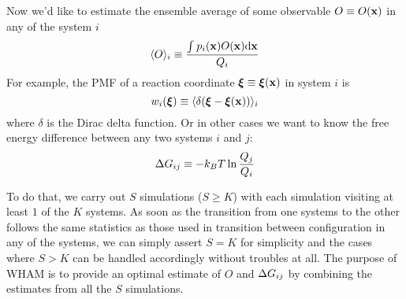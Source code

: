 Now we'd like to estimate the ensemble average of some observable 
$O \equiv O(\mathbf{x})$ in any of the system $i$
\begin{equation}\label{eq:O}
\langle O \rangle_{i} \equiv \frac{\int_{}^{}{p_{i}(\mathbf{x})O}(\mathbf{x})\mathrm{d}\mathbf{x}}{Q_{i}}
\end{equation}
For example, the PMF of a reaction coordinate 
$\boldsymbol\xi \equiv \boldsymbol\xi(\mathbf{x})$ in system $i$ is
\begin{equation}
\label{eq:PMF}
w_{i}(\boldsymbol\xi) \equiv \langle \delta(\boldsymbol\xi - \boldsymbol\xi(\mathbf{x})) \rangle_{i} 
\end{equation}
where $\delta$ is the Dirac delta function.
Or in other cases we want to know the free energy difference between 
any two systems $i$ and $j$:
\begin{equation}
\mathrm{\Delta}G_{ij} \equiv -k_{B}T \ln\frac{Q_{j}}{Q_{i}}
\label{eq:dG}
\end{equation}

To do that, we carry out $S$ simulations ($S \ge K$) with each 
simulation visiting at least $1$ of the $K$ systems. As soon as the transition 
from one systems to the other follows the same statistics as those used 
in transition between configuration in any of the systems, we can simply 
assert $S = K$ for simplicity and the cases where $S > K$ can be handled 
accordingly without troubles at all. The purpose of WHAM is to provide 
an optimal estimate of $O$ and $\mathrm{\Delta}G_{ij}$ by combining the estimates from 
all the $S$ simulations. 
